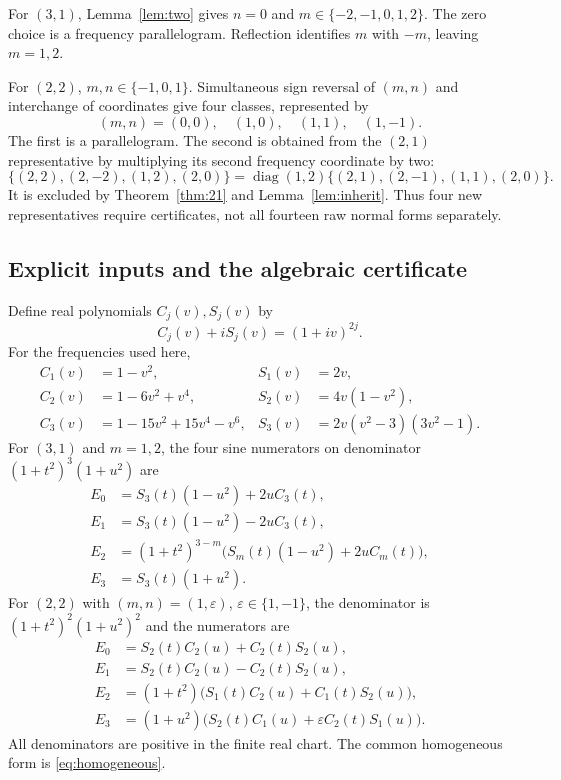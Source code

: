 \documentclass[11pt]{article}
\theoremstyle{definition}\newtheorem{definition}[theorem]{Definition}
\theoremstyle{remark}\newtheorem{remark}[theorem]{Remark}
\begin{document}
For $(3,1)$, Lemma~\ref{lem:two} gives $n=0$ and $m\in\{-2,-1,0,1,2\}$. The zero choice is a frequency parallelogram. Reflection identifies $m$ with $-m$, leaving $m=1,2$.

For $(2,2)$, $m,n\in\{-1,0,1\}$. Simultaneous sign reversal of $(m,n)$ and interchange of coordinates give four classes, represented by
\[
(m,n)=(0,0),\quad(1,0),\quad(1,1),\quad(1,-1).
\]
The first is a parallelogram. The second is obtained from the $(2,1)$ representative by multiplying its second frequency coordinate by two:
\[
\{(2,2),(2,-2),(1,2),(2,0)\}
=\operatorname{diag}(1,2)\{(2,1),(2,-1),(1,1),(2,0)\}.
\]
It is excluded by Theorem~\ref{thm:21} and Lemma~\ref{lem:inherit}. Thus four new representatives require certificates, not all fourteen raw normal forms separately.

\subsection{Explicit inputs and the algebraic certificate}
Define real polynomials $C_j(v),S_j(v)$ by
\[
C_j(v)+iS_j(v)=(1+iv)^{2j}.
\]
For the frequencies used here,
\begin{align*}
C_1(v)&=1-v^2,&S_1(v)&=2v,\\
C_2(v)&=1-6v^2+v^4,&S_2(v)&=4v(1-v^2),\\
C_3(v)&=1-15v^2+15v^4-v^6,&S_3(v)&=2v(v^2-3)(3v^2-1).
\end{align*}
For $(3,1)$ and $m=1,2$, the four sine numerators on denominator $(1+t^2)^3(1+u^2)$ are
\begin{align*}
E_0&=S_3(t)(1-u^2)+2uC_3(t),\\
E_1&=S_3(t)(1-u^2)-2uC_3(t),\\
E_2&=(1+t^2)^{3-m}\bigl(S_m(t)(1-u^2)+2uC_m(t)\bigr),\\
E_3&=S_3(t)(1+u^2).
\end{align*}
For $(2,2)$ with $(m,n)=(1,\varepsilon)$, $\varepsilon\in\{1,-1\}$, the denominator is $(1+t^2)^2(1+u^2)^2$ and the numerators are
\begin{align*}
E_0&=S_2(t)C_2(u)+C_2(t)S_2(u),\\
E_1&=S_2(t)C_2(u)-C_2(t)S_2(u),\\
E_2&=(1+t^2)\bigl(S_1(t)C_2(u)+C_1(t)S_2(u)\bigr),\\
E_3&=(1+u^2)\bigl(S_2(t)C_1(u)+\varepsilon C_2(t)S_1(u)\bigr).
\end{align*}
All denominators are positive in the finite real chart. The common homogeneous form is \eqref{eq:homogeneous}.
\end{document}
